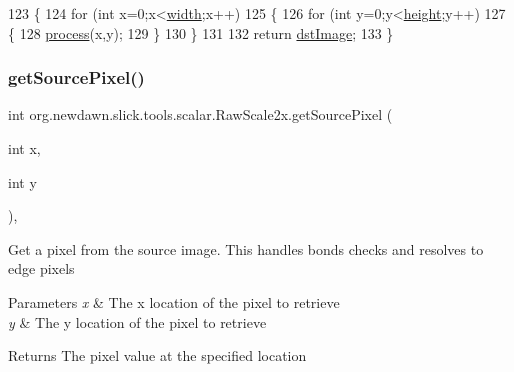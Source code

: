 \begin{DoxyCode}
123     \{
124         \textcolor{keywordflow}{for} (\textcolor{keywordtype}{int} x=0;x<\mbox{\hyperlink{classorg_1_1newdawn_1_1slick_1_1tools_1_1scalar_1_1_raw_scale2x_ac44a63899fa4a47dacffcf3c3fbc5526}{width}};x++)
125         \{
126             \textcolor{keywordflow}{for} (\textcolor{keywordtype}{int} y=0;y<\mbox{\hyperlink{classorg_1_1newdawn_1_1slick_1_1tools_1_1scalar_1_1_raw_scale2x_aadc4e62f40dbfa6633ca33b180aeea88}{height}};y++)
127             \{
128                 \mbox{\hyperlink{classorg_1_1newdawn_1_1slick_1_1tools_1_1scalar_1_1_raw_scale2x_a9b487c958a8d6498f319877102f6a390}{process}}(x,y);
129             \}
130         \}
131         
132         \textcolor{keywordflow}{return} \mbox{\hyperlink{classorg_1_1newdawn_1_1slick_1_1tools_1_1scalar_1_1_raw_scale2x_a27247e8c178805c2736db5f93ea8341e}{dstImage}};
133     \}
\end{DoxyCode}
\mbox{\label{classorg_1_1newdawn_1_1slick_1_1tools_1_1scalar_1_1_raw_scale2x_af37d8a900144bb574afb317fac5d23ee}} 
\subsubsection{\texorpdfstring{get\+Source\+Pixel()}{getSourcePixel()}}
{\footnotesize\ttfamily int org.\+newdawn.\+slick.\+tools.\+scalar.\+Raw\+Scale2x.\+get\+Source\+Pixel (\begin{DoxyParamCaption}\item[{int}]{x,  }\item[{int}]{y }\end{DoxyParamCaption})\hspace{0.3cm}{\ttfamily [inline]}, {\ttfamily [private]}}

Get a pixel from the source image. This handles bonds checks and resolves to edge pixels


\begin{DoxyParams}{Parameters}
{\em x} & The x location of the pixel to retrieve \\
\hline
{\em y} & The y location of the pixel to retrieve \\
\hline
\end{DoxyParams}
\begin{DoxyReturn}{Returns}
The pixel value at the specified location 
\end{DoxyReturn}

